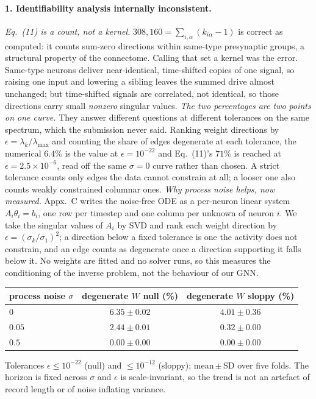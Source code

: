 \documentclass[11pt]{article}
\begin{document}
\paragraph{1. Identifiability analysis internally inconsistent.}
\emph{Eq.~(11) is a count, not a kernel.} $308{,}160 = \sum_{i,\alpha}
(k_{i\alpha}-1)$ is correct as computed: it counts sum-zero directions within
same-type presynaptic groups, a structural property of the connectome. Calling
that set a kernel was the error. Same-type neurons deliver near-identical,
time-shifted copies of one signal, so raising one input and lowering a sibling
leaves the summed drive almost unchanged; but time-shifted signals are
correlated, not identical, so those directions carry small \emph{nonzero}
singular values.
\label{link1}
\emph{The two percentages are two points on one curve.} They answer different
questions at different tolerances on the same spectrum, which the submission
never said. Ranking weight directions by $\epsilon = \lambda_k/\lambda_{\max}$
and counting the share of edges degenerate at each tolerance, the numerical
$6.4\%$ is the value at $\epsilon = 10^{-22}$ and Eq.~(11)'s $71\%$ is reached at
$\epsilon = 2.5\times10^{-6}$, read off the same $\sigma = 0$ curve rather than
chosen. A strict tolerance counts only edges the data cannot constrain at all; a
looser one also counts weakly constrained columnar ones.
\label{link2}
\emph{Why process noise helps, now measured.} Appx.~C writes the noise-free ODE
as a per-neuron linear system $A_i \theta_i = b_i$, one row per timestep and one
column per unknown of neuron $i$. We take the singular values of $A_i$ by SVD and
rank each weight direction by $\epsilon = (\sigma_k/\sigma_1)^2$; a direction
below a fixed tolerance is one the activity does not constrain, and an edge
counts as degenerate once a direction supporting it falls below it. No weights
are fitted and no solver runs, so this measures the conditioning of the inverse
problem, not the behaviour of our GNN.

\begin{center}
{\footnotesize
\begin{tabular}{lcc}
\toprule
process noise $\sigma$ & degenerate $W$ null (\%) & degenerate $W$ sloppy (\%) \\
\midrule
$0$    & $6.35 \pm 0.02$ & $4.01 \pm 0.36$ \\
$0.05$ & $2.44 \pm 0.01$ & $0.32 \pm 0.00$ \\
$0.5$  & $0.00 \pm 0.00$ & $0.00 \pm 0.00$ \\
\bottomrule
\end{tabular}}

{\footnotesize Tolerances $\epsilon \leq 10^{-22}$ (null) and $\leq 10^{-12}$
(sloppy); mean\,$\pm$\,SD over five folds. The horizon is fixed across $\sigma$
and $\epsilon$ is scale-invariant, so the trend is not an artefact of record
length or of noise inflating variance.}
\end{center}
\end{document}
